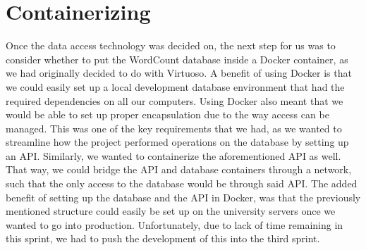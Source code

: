 \section{Containerizing}
Once the data access technology was decided on, the next step for us was to consider whether to put the WordCount database inside a Docker container, as we had originally decided to do with Virtuoso. A benefit of using Docker is that we could easily set up a local development database environment that had the required dependencies on all our computers. Using Docker also meant that we would be able to set up proper encapsulation due to the way access can be managed. This was one of the key requirements that we had, as we wanted to streamline how the \knox{} project performed operations on the database by setting up an API. 
Similarly, we wanted to containerize the aforementioned API as well. That way, we could bridge the API and database containers through a network, such that the only access to the database would be through said API.
The added benefit of setting up the database and the API in Docker, was that the previously mentioned structure could easily be set up on the university servers once we wanted to go into production.
Unfortunately, due to lack of time remaining in this sprint, we had to push the development of this into the third sprint.